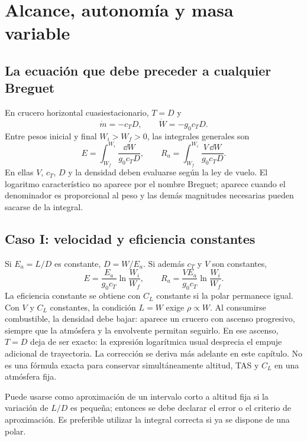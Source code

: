 \chapter{Alcance, autonomía y masa variable}\label{ch:breguet}

\section{La ecuación que debe preceder a cualquier Breguet}
En crucero horizontal cuasiestacionario, $T=D$ y
\begin{equation}
\dot m=-c_TD,\qquad \dot W=-g_0c_TD.
\end{equation}
Entre pesos inicial y final $W_i>W_f>0$, las integrales generales son
\begin{equation}
E=\int_{W_f}^{W_i}\frac{\dd W}{g_0c_TD},\qquad
R_a=\int_{W_f}^{W_i}\frac{V\,\dd W}{g_0c_TD}.
\label{eq:jet-general}
\end{equation}
En ellas $V$, $c_T$, $D$ y la densidad deben evaluarse según la ley de vuelo. El logaritmo característico no aparece por el nombre Breguet; aparece cuando el denominador es proporcional al peso y las demás magnitudes necesarias pueden sacarse de la integral.

\section{Caso I: velocidad y eficiencia constantes}
Si $E_a=L/D$ es constante, $D=W/E_a$. Si además $c_T$ y $V$ son constantes,
\begin{equation}
E=\frac{E_a}{g_0c_T}\ln\frac{W_i}{W_f},\qquad
R_a=\frac{VE_a}{g_0c_T}\ln\frac{W_i}{W_f}.
\label{eq:breguet-log}
\end{equation}
La eficiencia constante se obtiene con $C_L$ constante si la polar permanece igual. Con $V$ y $C_L$ constantes, la condición $L=W$ exige $\rho\propto W$. Al consumirse combustible, la densidad debe bajar: aparece un crucero con ascenso progresivo, siempre que la atmósfera y la envolvente permitan seguirlo. En ese ascenso, $T=D$ deja de ser exacto: la expresión logarítmica usual desprecia el empuje adicional de trayectoria. La corrección se deriva más adelante en este capítulo. No es una fórmula exacta para conservar simultáneamente altitud, TAS y $C_L$ en una atmósfera fija.

Puede usarse como aproximación de un intervalo corto a altitud fija si la variación de $L/D$ es pequeña; entonces se debe declarar el error o el criterio de aproximación. Es preferible utilizar la integral correcta si ya se dispone de una polar.

